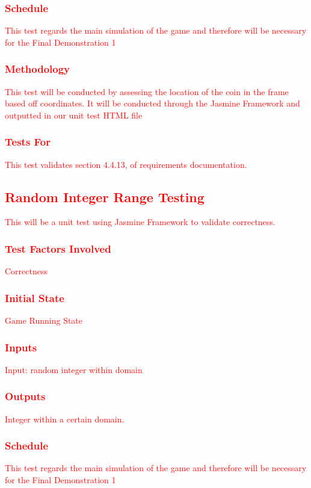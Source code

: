 \documentclass[11pt, oneside]{article}   	%
\begin{document}
\subsubsection{\textcolor{red}{Schedule}}
\textcolor{red}{This test regards the main simulation of the game and therefore will be necessary for the Final Demonstration 1}
\subsubsection{\textcolor{red}{Methodology}}
\textcolor{red}{This test will be conducted by assessing the location of the coin in the frame based off coordinates. It will be conducted through the Jasmine Framework and outputted in our unit test HTML file}
\subsubsection{\textcolor{red}{Tests For}}
\textcolor{red}{This test validates section 4.4.13, of requirements documentation.}


\subsection{\textcolor{red}{Random Integer Range Testing}}
\textcolor{red}{This will be a unit test using Jasmine Framework to validate correctness.}
\subsubsection{\textcolor{red}{Test Factors Involved}}
\textcolor{red}{Correctness}
\subsubsection{\textcolor{red}{Initial State}}
\textcolor{red}{Game Running State}
\subsubsection{\textcolor{red}{Inputs}}
\textcolor{red}{Input: random integer within domain}
\subsubsection{\textcolor{red}{Outputs}}
\textcolor{red}{Integer within a certain domain. }
\subsubsection{\textcolor{red}{Schedule}}
\textcolor{red}{This test regards the main simulation of the game and therefore will be necessary for the Final Demonstration 1}
\end{document}
